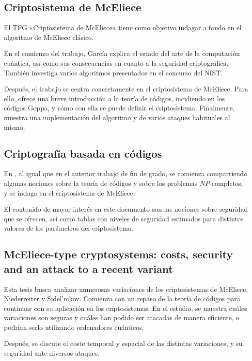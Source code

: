 \subsection{Criptosistema de McEliece}
El TFG «Criptosistema de McEliece» \autocite{McEliece2021} tiene como objetivo indagar a fondo en el algoritmo de McEliece clásico.

En el comienzo del trabajo, García explica el estado del arte de la computación cuántica, así como sus consecuencias en cuanto a la seguridad criptográfica. También investiga varios algoritmos presentados en el concurso del NIST.

Después, el trabajo se centra concretamente en el criptosistema de McEliece. Para ello, ofrece una breve introducción a la teoría de códigos, incidiendo en los códigos Goppa, y cómo con ella se puede definir el criptosistema. Finalmente, muestra una implementación del algoritmo y de varios ataques habituales al mismo.

\subsection{Criptografía basada en códigos}

En \autocite{Codes2024}, al igual que en el anterior trabajo de fin de grado, se comienza compartiendo algunas nociones sobre la teoría de códigos y sobre los problemas $NP$-completos, y se indaga en el criptosistema de McEliece.

El contenido de mayor interés en este documento son las nociones sobre seguridad que se ofrecen, así como tablas con niveles de seguridad estimados para distintos valores de los parámetros del criptosistema.

\subsection{McEliece-type cryptosystems: costs, security and an attack to a recent variant}

Esta tesis \autocite{costs} busca analizar numerosas variaciones de los criptosistemas de McEliece, Niederreiter y Sidel'nikov. Comienza con un repaso de la teoría de códigos para continuar con su aplicación en los criptosistemas. En el estudio, se muestra cuáles variaciones son seguras y cuáles han podido ser atacadas de manera eficiente, o podrían serlo utilizando ordenadores cuánticos.

Después, se discute el coste temporal y espacial de las distintas variaciones, y su seguridad ante diversos ataques.

